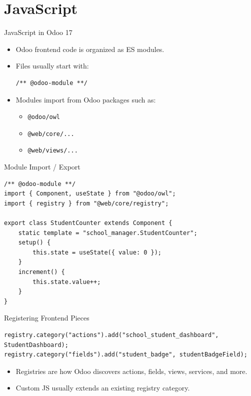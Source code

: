 \section{JavaScript}

\begin{frame}[fragile]{JavaScript in Odoo 17}
	\begin{itemize}
		\item Odoo frontend code is organized as ES modules.
		\item Files usually start with:
\begin{lstlisting}[style=js]
/** @odoo-module **/
\end{lstlisting}
		\item Modules import from Odoo packages such as:
		\begin{itemize}
			\item \texttt{@odoo/owl}
			\item \texttt{@web/core/...}
			\item \texttt{@web/views/...}
		\end{itemize}
	\end{itemize}
\end{frame}

\begin{frame}[fragile]{Module Import / Export}
\begin{lstlisting}[style=js]
/** @odoo-module **/
import { Component, useState } from "@odoo/owl";
import { registry } from "@web/core/registry";

export class StudentCounter extends Component {
	static template = "school_manager.StudentCounter";
	setup() {
		this.state = useState({ value: 0 });
	}
	increment() {
		this.state.value++;
	}
}
\end{lstlisting}
\end{frame}

\begin{frame}[fragile]{Registering Frontend Pieces}
\begin{lstlisting}[style=js]
registry.category("actions").add("school_student_dashboard", StudentDashboard);
registry.category("fields").add("student_badge", studentBadgeField);
\end{lstlisting}
	\begin{itemize}
		\item Registries are how Odoo discovers actions, fields, views, services, and more.
		\item Custom JS usually extends an existing registry category.
	\end{itemize}
\end{frame}

